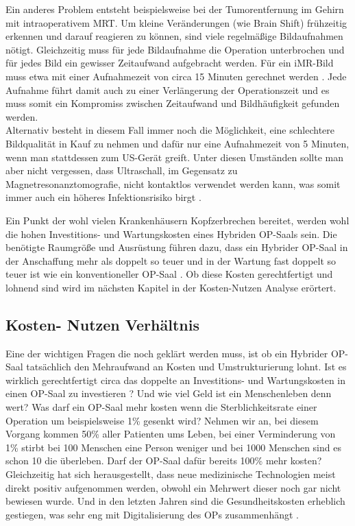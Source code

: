 Ein anderes Problem entsteht beispielsweise bei der Tumorentfernung im Gehirn mit intraoperativem MRT. Um kleine Veränderungen (wie Brain Shift) frühzeitig erkennen und darauf reagieren zu können, sind viele regelmäßige Bildaufnahmen nötigt. Gleichzeitig muss für jede Bildaufnahme die Operation unterbrochen und für jedes Bild ein gewisser Zeitaufwand aufgebracht werden. Für ein iMR-Bild muss etwa mit einer Aufnahmezeit von circa 15 Minuten gerechnet werden \cite{BrainShiftInTumorResection}. Jede Aufnahme führt damit auch zu einer Verlängerung der Operationszeit und es muss somit ein Kompromiss zwischen Zeitaufwand und Bildhäufigkeit gefunden werden.\\
Alternativ besteht in diesem Fall immer noch die Möglichkeit, eine schlechtere Bildqualität in Kauf zu nehmen und dafür nur eine Aufnahmezeit von 5 Minuten, wenn man stattdessen zum US-Gerät greift. Unter diesen Umständen sollte man aber nicht vergessen, dass Ultraschall, im Gegensatz zu Magnetresonanztomografie, nicht kontaktlos verwendet werden kann, was somit immer auch ein höheres Infektionsrisiko birgt \cite{BrainShiftInTumorResection}.

Ein Punkt der wohl vielen Krankenhäusern Kopfzerbrechen bereitet, werden wohl die hohen Investitions- und Wartungskosten eines Hybriden OP-Saals sein. Die benötigte Raumgröße und Ausrüstung führen dazu, dass ein Hybrider OP-Saal in der Anschaffung mehr als doppelt so teuer und in der Wartung fast doppelt so teuer ist wie ein konventioneller OP-Saal \cite{HybridOR}. 
Ob diese Kosten gerechtfertigt und lohnend sind wird im nächsten Kapitel in der Kosten-Nutzen Analyse erörtert.

\subsection{Kosten- Nutzen Verhältnis}

Eine der wichtigen Fragen die noch geklärt werden muss, ist ob ein Hybrider OP-Saal tatsächlich den Mehraufwand an Kosten und Umstrukturierung lohnt. 
Ist es wirklich gerechtfertigt circa das doppelte an Investitions- und Wartungskosten in einen OP-Saal zu investieren \cite{ORofTheFuture}? Und wie viel Geld ist ein Menschenleben denn wert? Was darf ein OP-Saal mehr kosten wenn die Sterblichkeitsrate einer Operation um beispielsweise 1\% gesenkt wird? Nehmen wir an, bei diesem Vorgang kommen 50\% aller Patienten ums Leben, bei einer Verminderung von 1\% stirbt bei 100 Menschen eine Person weniger und bei 1000 Menschen sind es schon 10 die überleben. Darf der OP-Saal dafür bereits 100\% mehr kosten?
Gleichzeitig hat sich herausgestellt, dass neue medizinische Technologien meist direkt positiv aufgenommen werden, obwohl ein Mehrwert dieser noch gar nicht bewiesen wurde. Und in den letzten Jahren sind die Gesundheitskosten erheblich gestiegen, was sehr eng mit Digitalisierung des OPs zusammenhängt \cite{DerDigitaleOperationssaal}.

